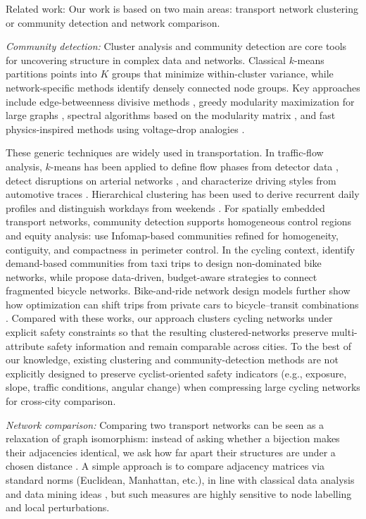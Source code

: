 \documentclass[lettersize,journal]{IEEEtran}
\begin{document}
Related work: Our work is based on two main areas: transport network clustering or community detection and network comparison.

\textit{Community detection:} Cluster analysis and community detection are core tools for uncovering structure in complex data and networks. Classical $k$-means \cite{hartigan1979algorithm} partitions points into $K$ groups that minimize within-cluster variance, while network-specific methods identify densely connected node groups. Key approaches include edge-betweenness divisive methods \cite{girvan2002community}, greedy modularity maximization for large graphs \cite{clauset2004finding}, spectral algorithms based on the modularity matrix \cite{newman2006finding}, and fast physics-inspired methods using voltage-drop analogies \cite{wu2004finding}.

These generic techniques are widely used in transportation. In traffic-flow analysis, $k$-means has been applied to define flow phases from detector data \cite{xia2007defining}, detect disruptions on arterial networks \cite{gu2016unsupervised}, and characterize driving styles from automotive traces \cite{gace2021driving}. Hierarchical clustering has been used to derive recurrent daily profiles and distinguish workdays from weekends \cite{weijermars2005analyzing}. For spatially embedded transport networks, community detection supports homogeneous control regions and equity analysis: \cite{haghbayan2021community} use Infomap-based communities refined for homogeneity, contiguity, and compactness in perimeter control. In the cycling context, \cite{akbarzadeh2018designing} identify demand-based communities from taxi trips to design non-dominated bike networks, while \cite{natera2020data} propose data-driven, budget-aware strategies to connect fragmented bicycle networks. Bike-and-ride network design models further show how optimization can shift trips from private cars to bicycle–transit combinations \cite{tavassoli2020hub}. Compared with these works, our approach clusters cycling networks under explicit safety constraints so that the resulting clustered-networks preserve multi-attribute safety information and remain comparable across cities. To the best of our knowledge, existing clustering and community-detection methods are not explicitly designed to preserve cyclist-oriented safety indicators (e.g., exposure, slope, traffic conditions, angular change) when compressing large cycling networks for cross-city comparison.



\textit{Network comparison:} Comparing two transport networks can be seen as a relaxation of graph isomorphism: instead of asking whether a bijection makes their adjacencies identical, we ask how far apart their structures are under a chosen distance \cite{chartrand2013first}. A simple approach is to compare adjacency matrices via standard norms (Euclidean, Manhattan, etc.), in line with classical data analysis and data mining ideas \cite{hand2007principles}, but such measures are highly sensitive to node labelling and local perturbations.
\end{document}
